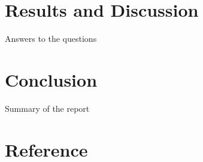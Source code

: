 \documentclass[
]{article}
\begin{document}
\hypertarget{results-and-discussion}{%
\section{Results and Discussion}\label{results-and-discussion}}

Answers to the questions

\hypertarget{conclusion}{%
\section{Conclusion}\label{conclusion}}

Summary of the report

\hypertarget{reference}{%
\section*{Reference}\label{reference}}
\end{document}

